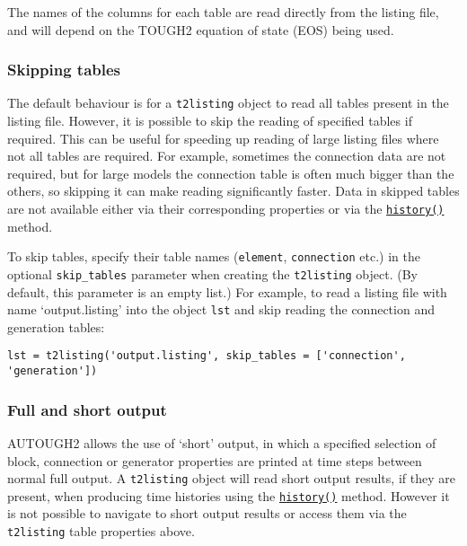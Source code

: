 The names of the columns for each table are read directly from the listing file, and will depend on the TOUGH2 equation of state (EOS) being used.

\subsubsection{Skipping tables}

The default behaviour is for a \texttt{t2listing} object to read all tables present in the listing file.  However, it is possible to skip the reading of specified tables if required.  This can be useful for speeding up reading of large listing files where not all tables are required.  For example, sometimes the connection data are not required, but for large models the connection table is often much bigger than the others, so skipping it can make reading significantly faster.  Data in skipped tables are not available either via their corresponding properties or via the \hyperref[sec:t2listing:history]{\texttt{history()}} method.

To skip tables, specify their table names (\texttt{element}, \texttt{connection} etc.) in the optional \texttt{skip\_tables} parameter when creating the \texttt{t2listing} object.  (By default, this parameter is an empty list.)  For example, to read a listing file with name `output.listing' into the object \texttt{lst} and skip reading the connection and generation tables:

\begin{lstlisting}
lst = t2listing('output.listing', skip_tables = ['connection', 'generation'])
\end{lstlisting}

\subsubsection{Full and short output}

AUTOUGH2 allows the use of `short' output, in which a specified selection of block, connection or generator properties are printed at time steps between normal full output.  A \texttt{t2listing} object will read short output results, if they are present, when producing time histories using the \hyperref[sec:t2listing:history]{\texttt{history()}} method.  However it is not possible to navigate to short output results or access them via the \texttt{t2listing} table properties above.

